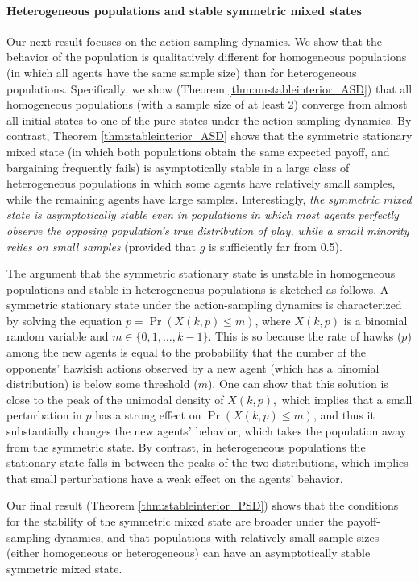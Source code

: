\documentclass[12pt]{article}
\numberwithin{equation}{section}
\numberwithin{figure}{section}
\theoremstyle{definition}
\theoremstyle{plain}
\theoremstyle{plain}
\theoremstyle{plain}
\theoremstyle{remark}
\theoremstyle{plain}
\theoremstyle{plain}
\begin{document}
\paragraph{Heterogeneous populations and stable symmetric mixed states} 
Our next result focuses on the action-sampling dynamics. We show that the behavior of the population is qualitatively different for homogeneous populations (in which all agents have the same sample size) than for heterogeneous populations. Specifically, we show (Theorem \ref{thm:unstableinterior_ASD}) that all homogeneous populations (with a sample size of at least 2) converge from almost all initial states to one of the pure states under the action-sampling dynamics. By contrast, Theorem \ref{thm:stableinterior_ASD} shows that the symmetric stationary  mixed state (in which both populations obtain the same expected payoff, and bargaining frequently fails) is asymptotically stable in a large class of heterogeneous populations in which some agents have relatively small samples, while the remaining agents have large samples. Interestingly, \emph{the symmetric mixed state is asymptotically stable even in populations in which most agents perfectly observe the opposing population's true distribution of play, while a small minority relies on small samples} (provided that $g$ is sufficiently far from 0.5).

The argument that the symmetric stationary state  is unstable in homogeneous  populations and stable in heterogeneous populations is sketched as follows. A symmetric stationary state under the action-sampling dynamics is characterized by solving the equation $p=\Pr(X(k,p)\leq{m})$, where $X(k,p)$ is a binomial random variable and $m\in \{0,1,\dots,k-1\}$. This is so because the rate of hawks ($p$) among the new agents is equal to the probability that the number of the opponents' hawkish actions observed by a new agent (which has a binomial distribution) is below some threshold ($m$). One can show that this solution is close to the peak of the unimodal density of $X(k,p),$ which implies that a small perturbation in $p$ has a strong effect on $\Pr(X(k,p)\leq{m})$, and thus it substantially changes the new agents' behavior, which takes the population away from the symmetric state. By contrast, in heterogeneous populations the stationary state falls in between the peaks of the two distributions, which implies that small perturbations have a weak effect on the agents' behavior.

Our final result (Theorem \ref{thm:stableinterior_PSD}) shows that the conditions for the stability of the symmetric mixed state are broader under the payoff-sampling dynamics, and that populations with relatively small sample sizes (either homogeneous or heterogeneous) can have an asymptotically stable symmetric mixed state.
\end{document}
